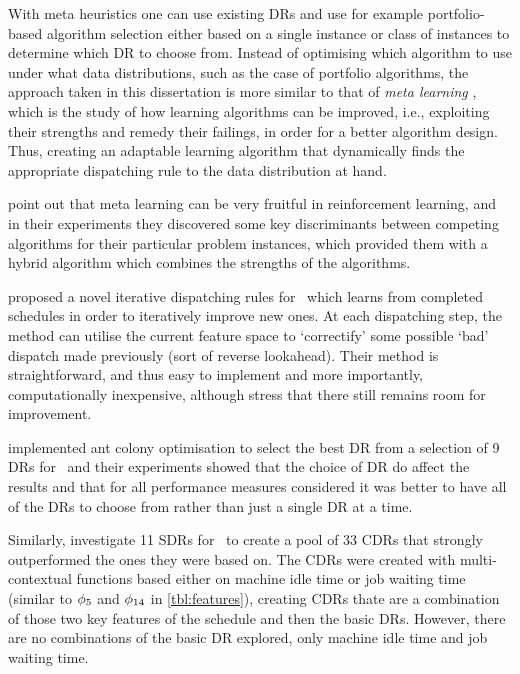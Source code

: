 With meta heuristics one can use existing DRs and use for example 
{portfolio-based algorithm selection} either based 
on a single instance \citep{Rice76,Gomes01} or class of instances \citep{Xu07} 
to determine which DR to choose from. 
Instead of optimising which algorithm to use under what data distributions, 
such as the case of portfolio algorithms, the approach taken in this 
dissertation is more similar to that of \emph{meta learning} \citep{Vilalta02}, 
which is the study of how learning algorithms can be improved, i.e., exploiting 
their strengths and remedy their failings, in order for a better algorithm 
design. Thus, creating an adaptable learning algorithm that dynamically finds 
the appropriate dispatching rule  to the data distribution at hand. 

\citet{Kalyanakrishnan11} point out that meta learning can be very fruitful in 
reinforcement learning, and in their experiments they discovered some key 
discriminants between competing algorithms for their particular problem 
instances, which provided them with a hybrid algorithm which combines the 
strengths of the algorithms.

\citet{Nguyen13} proposed a novel {iterative dispatching rules} for \JSP\ 
which learns from completed schedules in order to iteratively improve new ones. 
At each dispatching step, the method can utilise the current feature space to 
`correctify' some possible `bad' dispatch made previously (sort of reverse 
lookahead). Their method is straightforward, and thus easy to implement and 
more importantly, computationally inexpensive, although \citeauthor{Nguyen13} 
stress that there still remains room for improvement. 

\citet{Korytkowski13} implemented {ant colony optimisation} to select the 
best DR from a selection of 9 DRs for \JSP\ and their experiments showed 
that the choice of DR do affect the results and that for all performance 
measures considered it was better to have all of the DRs to choose from rather 
than just a single DR at a time. 

Similarly, \citet{Lu13} investigate 11 SDRs for \JSP\ to create a pool of 
33 CDRs that strongly outperformed the ones they were based on. The CDRs were 
created with {multi-contextual functions} based either on machine idle time 
or job waiting time (similar to $\phi_5$ and $\phi_{14}$ in 
\cref{tbl:features}), creating CDRs thate are a combination of those 
two key features of the schedule and then the basic DRs. However, there are no 
combinations of the basic DR explored, only machine idle time and job waiting 
time.  

